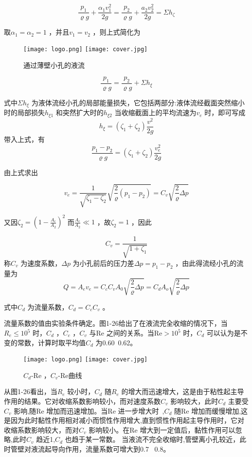 
$$ \frac{p_1}{\varrho g}+\frac{\alpha _1v_{1}^{2}}{2g}=\frac{p_2}{\varrho g}+\frac{a_2v_{2}^{2}}{2g}=\varSigma h_{\zeta} $$ 

\noindent 取$ \alpha _1=\alpha _2=1 $ ，并且$ v_1=v_2 $ ，则上式简化为
\begin{figure}[h]\centering
\ifOpenSource
\texttt{[image: logo.png]}
\else
\texttt{[image: cover.jpg]}
\fi
\caption{通过薄壁小孔的液流}
\label{fig:fig0125}
\end{figure}

$$ \frac{p_1}{\varrho g}=\frac{p_2}{\varrho g}+\varSigma h_{\xi} $$ 

\noindent 式中$ \varSigma h_{\xi} $ 为液体流经小孔的局部能量损失，它包括两部分:液体流经截面突然缩小时的局部损失$ h_{\xi 1} $ 和突然扩大时的$ h_{\xi 2} $ 当收缩截面上的平均流速为$ v_e $ 时，即可写成
$$ h_{\xi}=\left( \zeta _1+\zeta _2 \right) \frac{v^2}{2g} $$
\noindent 带入上式，有
$$ \frac{p_1-p_2}{\varrho g}=\left( \zeta _1+\zeta _2 \right) \frac{v_{e}^{2}}{2g} $$ 

\noindent 由上式求出

$$ v_e=\frac{1}{\sqrt{\zeta _1-\zeta _2}}\sqrt{\frac{2}{\varrho}\left( p_1-p_2 \right)}=C_v\sqrt{\frac{2}{\varrho}\varDelta p} $$ 

\noindent 又因$ \zeta _2=\left( 1-\frac{A_e}{A_2} \right) ^2 $ 而$ \frac{A_e}{A_2}\ll 1 $ ，故$ \zeta _2=1 $ ，因此

$$ C_v=\frac{1}{\sqrt{1+\zeta _1}} $$ 
\noindent 称$ C_v $ 为速度系数，$ \varDelta p $ 为小孔前后的压力差$ \varDelta p=p_1-p_2 $ ，由此得流经小孔的流量为
$$ Q=A_ev_e=C_cC_vA_0\sqrt{\frac{2}{\varrho}\varDelta p}=C_dA_o\sqrt{\frac{2}{\varrho}\varDelta p} $$ 

\noindent 式中$ C_d $ 为流量系数，$ C_d=C_cC_v $ 。

流量系数的值由实验条件确定。图1-26给出了在液流完全收缩的情况下，当$ R_e\le 10^5 $ 时，$ C_d $ ，$ C_c $ ，$ C_v $ 与$ \text{Re} $ 之间的关系。当$ \text{Re}>10^5 $ 时，$ C_d $ 可以认为是不变的常数，计算时取平均值$ C_d $ 为0.60~0.62。

\begin{figure}[h]\centering
\ifOpenSource
\texttt{[image: logo.png]}
\else
\texttt{[image: cover.jpg]}
\fi
\caption{$ C_d $-$ \text{Re} $ ，$ C_v $-$ \text{Re} $曲线}
\label{fig:fig0126}
\end{figure}

从图1-26看出，当$ R_e $ 较小时，$ C_d $ 随$ R_e $ 的增大而迅速增大，这是由于粘性起主导作用的结果。它对收缩系数影响较小，而对速度系数$ C_v $ 影响较大，此时$ C_d $ 主要受$ C_v $ 影响,随$ \text{Re} $ 增加而迅速增加。当$ \text{Re} $ 进一步增大时 ,$ C_d $ 随$ \text{Re} $ 增加而缓慢增加,这是因为此时黏性作用相对减小而惯性作用增大,直到惯性作用起主导作用时，它对收缩系数影响较大，而对$ C_v $ 影响较小。在$ \text{Re} $ 增大到一定值后，黏性作用可以忽略,此时$ C_v $ 趋近1,$ C_d $ 也趋于某一常数。
当液流不完全收缩时,管壁离小孔较近，此时管壁对液流起导向作用，流量系数可增大到0.7~ 0.8。

